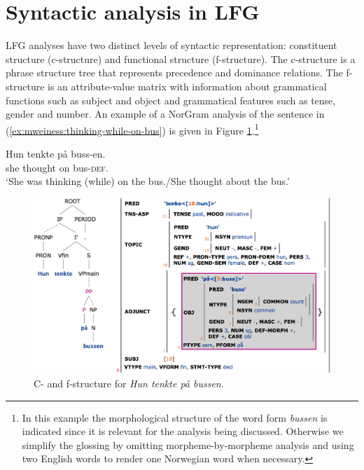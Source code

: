 \documentclass[output=paper]{langsci/langscibook}
\newcommand{\definite}{\textsc{def}{}\xspace}	%
\begin{document}
\section{Syntactic analysis in LFG}\label{sec:mweiness:LFG}

LFG analyses have two distinct levels of syntactic representation: constituent structure (c-structure) and functional structure (f-structure).
The c-structure is a phrase structure tree that represents precedence and dominance relations.
The f-structure is an attribute-value matrix with information about grammatical functions such as subject and object and grammatical features such as tense, gender and number.
An example of a NorGram analysis of the sentence in (\ref{ex:mweiness:thinking-while-on-bus}) is given in Figure \ref{fig:mweiness:thinking-while-on-bus}.\footnote{In this example the morphological structure of the word form \textit{bussen} is indicated since it is relevant for the analysis being discussed.
Otherwise we simplify the glossing by omitting morpheme-by-morpheme analysis and using two English words to render one Norwegian word when necessary.}

\ea\label{ex:mweiness:thinking-while-on-bus}
\gll Hun tenkte på buss-en. \\
     she thought on bus-{\definite}.{\sg}\\
\glt `She was thinking (while) on the bus./She thought about the bus.’
\z

\begin{figure}
  \includegraphics[width=\textwidth]{figures/tenke-paa-bussen-highlight.png}
  \caption{C- and f-structure for \textit{Hun tenkte på bussen}.}
  \label{fig:mweiness:thinking-while-on-bus}
\end{figure}
\end{document}
